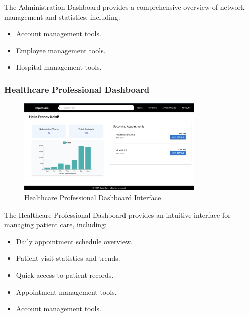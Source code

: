 \documentclass[12pt, titlepage]{article}
\begin{document}
The Administration Dashboard provides a comprehensive overview of network management and statistics, including:
\begin{itemize}
\item Account management tools.
\item Employee management tools.
\item Hospital management tools.
\end{itemize}

\subsubsection{Healthcare Professional Dashboard}
\begin{figure}[H]
\centering
\includegraphics[width=0.8\textwidth]{healthcare.png}
\caption{Healthcare Professional Dashboard Interface}
\label{fig:healthcare_dashboard}
\end{figure}

The Healthcare Professional Dashboard provides an intuitive interface for managing patient care, including:
\begin{itemize}
\item Daily appointment schedule overview.
\item Patient visit statistics and trends.
\item Quick access to patient records.
\item Appointment management tools.
\item Account management tools.
\end{itemize}
\end{document}
